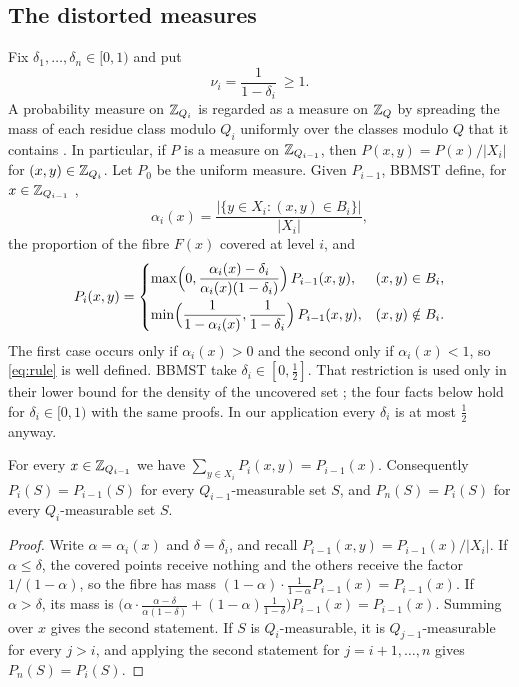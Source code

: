 \subsection{The distorted measures}\label{sec:measures}

Fix $\delta_1,\dots,\delta_n\in[0,1)$ and put
\[
  \nu_i=\frac1{1-\delta_i}\ \ge1 .
\]
A probability measure on $\mathbb{Z}_{Q_i}$ is regarded as a measure on $\mathbb{Z}_Q$ by spreading the mass of each residue class
modulo $Q_i$ uniformly over the classes modulo $Q$ that it contains \cite[footnote~2]{BBMST}. In particular, if $P$
is a measure on $\mathbb{Z}_{Q_{i-1}}$, then $P(x,y)=P(x)/|X_i|$ for $(x,y)\in\mathbb{Z}_{Q_i}$. Let $P_0$ be the uniform measure.
Given $P_{i-1}$, BBMST define, for $x\in\mathbb{Z}_{Q_{i-1}}$ \cite[(4)]{BBMST},
\begin{equation}\label{eq:alpha}
  \alpha_i(x)=\frac{\bigl|\{y\in X_i:(x,y)\in B_i\}\bigr|}{|X_i|},
\end{equation}
the proportion of the fibre $F(x)$ covered at level $i$, and \cite[(5)]{BBMST}
\begin{equation}\label{eq:rule}
  P_i(x,y)=
  \begin{cases}
    \max\Bigl(0,\dfrac{\alpha_i(x)-\delta_i}{\alpha_i(x)(1-\delta_i)}\Bigr)\,P_{i-1}(x,y), & (x,y)\in B_i,\\[3mm]
    \min\Bigl(\dfrac1{1-\alpha_i(x)},\dfrac1{1-\delta_i}\Bigr)\,P_{i-1}(x,y), & (x,y)\notin B_i.
  \end{cases}
\end{equation}
The first case occurs only if $\alpha_i(x)>0$ and the second only if $\alpha_i(x)<1$, so \eqref{eq:rule} is well
defined. BBMST take $\delta_i\in[0,\frac12]$. That restriction is used only in their lower bound for the density
of the uncovered set \cite[Lemma~3.5]{BBMST}; the four facts below hold for $\delta_i\in[0,1)$ with the same
proofs. In our application every $\delta_i$ is at most $\frac12$ anyway.

\begin{lemma}\label{lem:F1}
For every $x\in\mathbb{Z}_{Q_{i-1}}$ we have $\sum_{y\in X_i}P_i(x,y)=P_{i-1}(x)$. Consequently $P_i(S)=P_{i-1}(S)$ for
every $Q_{i-1}$-measurable set $S$, and $P_n(S)=P_i(S)$ for every $Q_i$-measurable set $S$.
\end{lemma}

\begin{proof}
Write $\alpha=\alpha_i(x)$ and $\delta=\delta_i$, and recall $P_{i-1}(x,y)=P_{i-1}(x)/|X_i|$. If $\alpha\le\delta$,
the covered points receive nothing and the others receive the factor $1/(1-\alpha)$, so the fibre has mass
$(1-\alpha)\cdot\frac1{1-\alpha}P_{i-1}(x)=P_{i-1}(x)$. If $\alpha>\delta$, its mass is
$\bigl(\alpha\cdot\frac{\alpha-\delta}{\alpha(1-\delta)}+(1-\alpha)\frac1{1-\delta}\bigr)P_{i-1}(x)=P_{i-1}(x)$.
Summing over $x$ gives the second statement. If $S$ is $Q_i$-measurable, it is $Q_{j-1}$-measurable for every
$j>i$, and applying the second statement for $j=i+1,\dots,n$ gives $P_n(S)=P_i(S)$.
\end{proof}

